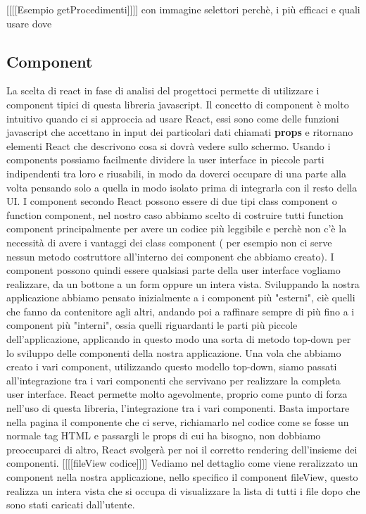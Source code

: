   [[[[Esempio getProcedimenti]]]] con immagine
selettori perchè, i più efficaci e quali usare dove

\subsection{Component}
La scelta di react in fase di analisi del progettoci permette di utilizzare i component tipici di questa libreria javascript. Il concetto di component è molto intuitivo quando ci si
approccia ad usare React, essi sono come delle funzioni javascript che accettano in input dei particolari dati chiamati \textbf{props} e ritornano elementi React che
descrivono cosa si dovrà vedere sullo schermo. Usando i components possiamo facilmente dividere la user interface in piccole parti indipendenti tra loro e riusabili, in modo da doverci occupare di
una parte alla volta pensando solo a quella in modo isolato prima di integrarla con il resto della UI.
I component secondo React possono essere di due tipi class component o function component, nel nostro caso abbiamo scelto di costruire tutti function component principalmente per avere un codice più
leggibile e perchè non c'è la necessità di avere i vantaggi dei class component ( per esempio non ci serve nessun metodo costruttore all'interno dei component che abbiamo creato).
I component possono quindi essere qualsiasi parte della user interface vogliamo realizzare, da un bottone a un form oppure un intera vista. Sviluppando la nostra applicazione abbiamo pensato inizialmente
a i component più "esterni", ciè quelli che fanno da contenitore agli altri, andando poi a raffinare sempre di più fino a i component più "interni", ossia quelli riguardanti le parti più piccole dell'applicazione, applicando
in questo modo una sorta di metodo top-down per lo sviluppo delle componenti della nostra applicazione.
Una vola che abbiamo creato i vari component, utilizzando questo modello top-down, siamo passati all'integrazione tra i vari componenti che servivano per realizzare la completa user interface. React permette
molto agevolmente, proprio come punto di forza nell'uso di questa libreria, l'integrazione tra i vari componenti. Basta importare nella pagina il componente che ci serve, richiamarlo nel codice come se fosse un normale tag
HTML e passargli le props di cui ha bisogno, non dobbiamo preoccuparci di altro, React svolgerà per noi il corretto rendering dell'insieme dei componenti.
  [[[[fileView codice]]]]
Vediamo nel dettaglio come viene reralizzato un component nella nostra applicazione, nello specifico il component fileView, questo realizza un intera vista che si occupa di visualizzare la lista di tutti i file dopo che sono stati caricati dall'utente.
